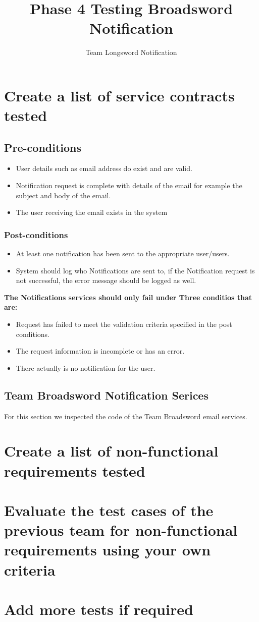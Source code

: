 \documentclass[11pt]{article}
\author{Team Longsword Notification}
\title{Phase 4 Testing Broadsword Notification}
\begin{document}
	\setlength{\parskip}{6pt}
	
	
	
	\tableofcontents
	
	\newpage
	
	
	\section{Create a list of service contracts tested}
	\subsection{Pre-conditions}
	\begin{itemize}
		\item User details such as email address do exist and are valid.
		\item Notification request is complete with details of the email for example the subject and body of the email.
		\item The user receiving the email exists in the system
	\end{itemize}
	\subsubsection{Post-conditions}
	\begin{itemize}
		\item At least one notification has been sent to the appropriate user/users.
		\item System should log who Notifications are sent to, if the Notification request is not successful, the error message should be logged as well.
	\end{itemize}
	\textbf{The Notifications services should only fail under Three conditios that are:}
	\begin{itemize}
		\item Request has failed to meet the validation criteria specified in the post conditions.
		\item The request information is incomplete or has an error.
		\item There actually is no notification for the user.
	\end{itemize}
	\subsection{Team Broadsword Notification Serices}
	For this section we inspected the code of the Team Broadsword email services.
	\section{Create a list of non-functional requirements tested}
	\section{Evaluate the test cases of the previous team for non-functional requirements using your own criteria}	
	\section{Add more tests if required}


	
	
\end{document}

